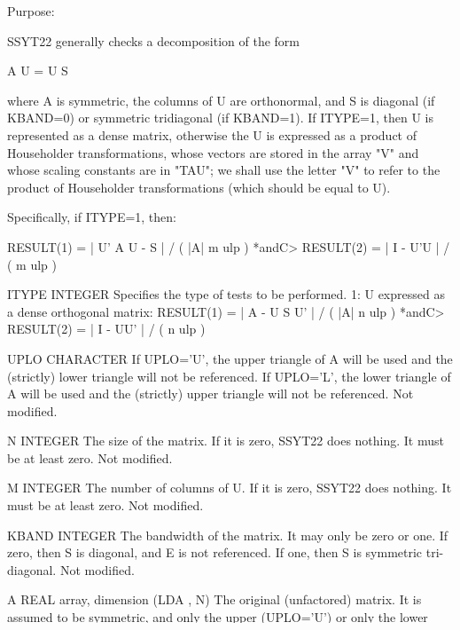 \begin{DoxyParagraph}{Purpose\+: }
\begin{DoxyVerb}      SSYT22  generally checks a decomposition of the form

              A U = U S

      where A is symmetric, the columns of U are orthonormal, and S
      is diagonal (if KBAND=0) or symmetric tridiagonal (if
      KBAND=1).  If ITYPE=1, then U is represented as a dense matrix,
      otherwise the U is expressed as a product of Householder
      transformations, whose vectors are stored in the array "V" and
      whose scaling constants are in "TAU"; we shall use the letter
      "V" to refer to the product of Householder transformations
      (which should be equal to U).

      Specifically, if ITYPE=1, then:

              RESULT(1) = | U' A U - S | / ( |A| m ulp ) *andC>              RESULT(2) = | I - U'U | / ( m ulp )\end{DoxyVerb}
 \begin{DoxyVerb}  ITYPE   INTEGER
          Specifies the type of tests to be performed.
          1: U expressed as a dense orthogonal matrix:
             RESULT(1) = | A - U S U' | / ( |A| n ulp )   *andC>             RESULT(2) = | I - UU' | / ( n ulp )

  UPLO    CHARACTER
          If UPLO='U', the upper triangle of A will be used and the
          (strictly) lower triangle will not be referenced.  If
          UPLO='L', the lower triangle of A will be used and the
          (strictly) upper triangle will not be referenced.
          Not modified.

  N       INTEGER
          The size of the matrix.  If it is zero, SSYT22 does nothing.
          It must be at least zero.
          Not modified.

  M       INTEGER
          The number of columns of U.  If it is zero, SSYT22 does
          nothing.  It must be at least zero.
          Not modified.

  KBAND   INTEGER
          The bandwidth of the matrix.  It may only be zero or one.
          If zero, then S is diagonal, and E is not referenced.  If
          one, then S is symmetric tri-diagonal.
          Not modified.

  A       REAL array, dimension (LDA , N)
          The original (unfactored) matrix.  It is assumed to be
          symmetric, and only the upper (UPLO='U') or only the lower
          (UPLO='L') will be referenced.
          Not modified.


\end{DoxyVerb}
\end{DoxyParagraph}
